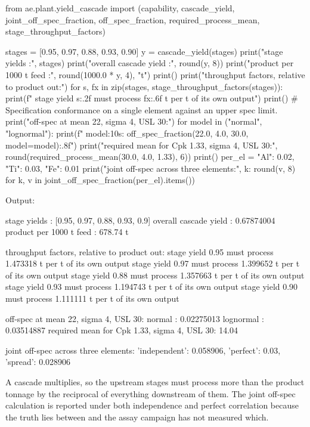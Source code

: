\documentclass[10pt,a4paper,twoside]{report}
\begin{document}
\begin{doctestblock}
from ae.plant.yield_cascade import (capability, cascade_yield, joint_off_spec_fraction,
                                    off_spec_fraction, required_process_mean,
                                    stage_throughput_factors)

stages = [0.95, 0.97, 0.88, 0.93, 0.90]
y = cascade_yield(stages)
print("stage yields            :", stages)
print("overall cascade yield   :", round(y, 8))
print("product per 1000 t feed :", round(1000.0 * y, 4), "t")
print()
print("throughput factors, relative to product out:")
for s, fx in zip(stages, stage_throughput_factors(stages)):
    print(f"  stage yield {s:.2f} must process {fx:.6f} t per t of its own output")
print()
# Specification conformance on a single element against an upper spec limit.
print("off-spec at mean 22, sigma 4, USL 30:")
for model in ("normal", "lognormal"):
    print(f"  {model:10s}: {off_spec_fraction(22.0, 4.0, 30.0, model=model):.8f}")
print("required mean for Cpk 1.33, sigma 4, USL 30:",
      round(required_process_mean(30.0, 4.0, 1.33), 6))
print()
per_el = {"Al": 0.02, "Ti": 0.03, "Fe": 0.01}
print("joint off-spec across three elements:", 
      {k: round(v, 8) for k, v in joint_off_spec_fraction(per_el).items()})
\end{doctestblock}

{\footnotesize\color{slate}Output:\par}

\begin{outputblock}
stage yields            : [0.95, 0.97, 0.88, 0.93, 0.9]
overall cascade yield   : 0.67874004
product per 1000 t feed : 678.74 t

throughput factors, relative to product out:
  stage yield 0.95 must process 1.473318 t per t of its own output
  stage yield 0.97 must process 1.399652 t per t of its own output
  stage yield 0.88 must process 1.357663 t per t of its own output
  stage yield 0.93 must process 1.194743 t per t of its own output
  stage yield 0.90 must process 1.111111 t per t of its own output

off-spec at mean 22, sigma 4, USL 30:
  normal    : 0.02275013
  lognormal : 0.03514887
required mean for Cpk 1.33, sigma 4, USL 30: 14.04

joint off-spec across three elements: {'independent': 0.058906, 'perfect': 0.03, 'spread': 0.028906}
\end{outputblock}

A cascade multiplies, so the upstream stages must process more than the product tonnage by the reciprocal of everything downstream of them. The joint off-spec calculation is reported under both independence and perfect correlation because the truth lies between and the assay campaign has not measured which.
\end{document}
